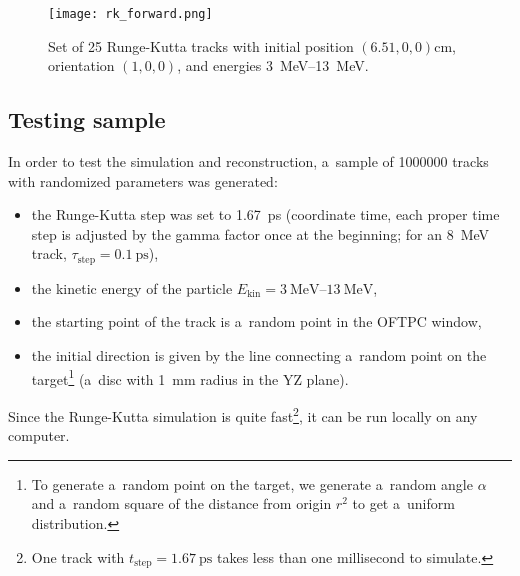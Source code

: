 		\begin{figure}
			\centering
			\texttt{[image: rk\_forward.png]}
			\caption{Set of \num{25} Runge-Kutta tracks with initial position $(6.51,0,0) \unit{\cm}$, orientation $(1,0,0)$, and energies \qtyrange{3}{13}{\MeV}.}
			\label{fig:rk_forward}
		\end{figure}
					
		\subsection{Testing sample}
		\label{sec:rktest}		
		In order to test the simulation and reconstruction, a~sample of \num{1000000} tracks with randomized parameters was generated:
		\begin{itemize}[topsep=4pt,itemsep=2pt]
			\item the Runge-Kutta step was set to \qty{1.67}{\ps} (coordinate time, each proper time step is adjusted by the gamma factor once at the beginning; for an \qty{8}{\MeV} track, $\tau_\text{step} = \qty{0.1}{\ps}$),
			\item the kinetic energy of the particle $E_\text{kin} = \qtyrange{3}{13}{\MeV}$,
			\item the starting point of the track is a~random point in the \ac{OFTPC} window,
			\item the initial direction is given by the line connecting a~random point on the target\footnote{To generate a~random point on the target, we generate a~random angle $\alpha$ and a~random square of the distance from origin $r^2$ to get a~uniform distribution.} (a~disc with 1~mm radius in the YZ plane).
		\end{itemize}
		Since the Runge-Kutta simulation is quite fast\footnote{One track with $t_\text{step} = \qty{1.67}{\ps}$ takes less than one millisecond to simulate.}, it can be run locally on any computer.